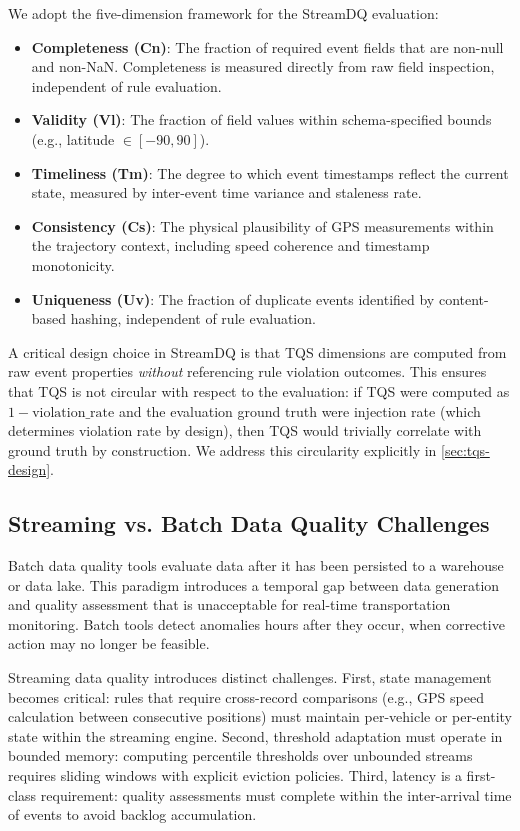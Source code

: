 We adopt the five-dimension framework for the StreamDQ evaluation:

\begin{itemize}
  \item \textbf{Completeness (Cn)}: The fraction of required event fields
        that are non-null and non-NaN. Completeness is measured directly
        from raw field inspection, independent of rule evaluation.
  \item \textbf{Validity (Vl)}: The fraction of field values within
        schema-specified bounds (e.g., latitude $\in [-90, 90]$).
  \item \textbf{Timeliness (Tm)}: The degree to which event timestamps
        reflect the current state, measured by inter-event time variance
        and staleness rate.
  \item \textbf{Consistency (Cs)}: The physical plausibility of GPS
        measurements within the trajectory context, including speed
        coherence and timestamp monotonicity.
  \item \textbf{Uniqueness (Uv)}: The fraction of duplicate events
        identified by content-based hashing, independent of rule evaluation.
\end{itemize}

A critical design choice in StreamDQ is that TQS dimensions are computed
from raw event properties \textit{without} referencing rule violation outcomes.
This ensures that TQS is not circular with respect to the evaluation:
if TQS were computed as $1 - \text{violation\_rate}$ and the evaluation
ground truth were injection rate (which determines violation rate by design),
then TQS would trivially correlate with ground truth by construction.
We address this circularity explicitly in \ref{sec:tqs-design}.

\subsection{Streaming vs. Batch Data Quality Challenges}

Batch data quality tools evaluate data after it has been persisted to a
warehouse or data lake. This paradigm introduces a temporal gap between
data generation and quality assessment that is unacceptable for real-time
transportation monitoring. Batch tools detect anomalies hours after they
occur, when corrective action may no longer be feasible.

Streaming data quality introduces distinct challenges. First, state
management becomes critical: rules that require cross-record comparisons
(e.g., GPS speed calculation between consecutive positions) must maintain
per-vehicle or per-entity state within the streaming engine. Second,
threshold adaptation must operate in bounded memory: computing percentile
thresholds over unbounded streams requires sliding windows with explicit
eviction policies. Third, latency is a first-class requirement: quality
assessments must complete within the inter-arrival time of events to avoid
backlog accumulation.

